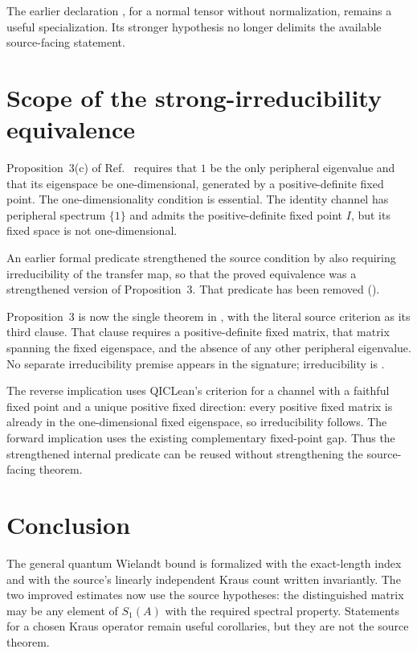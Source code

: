 \documentclass{article}
\begin{document}
The earlier declaration , for a normal
tensor without normalization, remains a useful specialization. Its stronger
hypothesis no longer delimits the available source-facing statement.

\section{Scope of the strong-irreducibility equivalence}

Proposition~3(c) of Ref.~\cite{Sanz2010Quantum} requires that $1$ be the only
peripheral eigenvalue and that its eigenspace be one-dimensional, generated by
a positive-definite fixed point. The one-dimensionality condition is
essential. The identity channel has peripheral spectrum $\{1\}$ and admits
the positive-definite fixed point $I$, but its fixed space is not
one-dimensional.

An earlier formal predicate strengthened the source condition by also
requiring irreducibility of the transfer map, so that the proved equivalence
was a strengthened version of Proposition~3. That predicate has been removed
().

Proposition~3 is now the single theorem
in , with the literal
source criterion as its third clause.
That clause requires a positive-definite fixed matrix, that matrix spanning
the fixed eigenspace, and the absence of any other peripheral eigenvalue. No
separate irreducibility premise appears in the signature; irreducibility is
.

The reverse implication uses QICLean's criterion for a channel with a faithful
fixed point and a unique positive fixed direction: every positive fixed matrix
is already in the one-dimensional fixed eigenspace, so irreducibility follows.
The forward implication uses the existing complementary fixed-point gap.
Thus the strengthened internal predicate can be reused without strengthening
the source-facing theorem.

\section{Conclusion}

The general quantum Wielandt bound is formalized with the exact-length index
and with the source's linearly independent Kraus count written invariantly.
The two improved estimates now use the source hypotheses: the distinguished
matrix may be any element of $S_1(A)$ with the required spectral property.
Statements for a chosen Kraus operator remain useful corollaries, but they are
not the source theorem.
\end{document}
